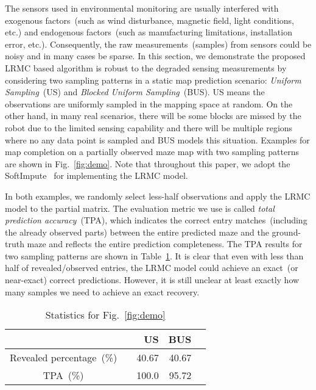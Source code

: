 The sensors used in environmental monitoring are usually interfered with exogenous factors~(such as wind disturbance, magnetic field, light conditions, etc.) and endogenous factors~(such as manufacturing limitations, installation error, etc.). Consequently, the raw measurements~(samples) from sensors could be noisy and in many cases be sparse. In this section, we demonstrate the proposed LRMC based algorithm is robust to the degraded sensing measurements by considering two sampling patterns in a static map prediction scenario: \textit{Uniform Sampling}~(US) and \textit{Blocked Uniform Sampling}~(BUS). US means the observations are uniformly sampled in the mapping space at random. On the other hand, in many real scenarios, there will be some blocks are missed by the robot due to the limited sensing capability and there will be multiple regions where no any data point is sampled and BUS models this situation. Examples for map completion on a partially observed maze map with two sampling patterns are shown in Fig.~\ref{fig:demo}. Note that throughout this paper, we adopt the  SoftImpute~\cite{mazumder2010spectral} for implementing the LRMC model.

In both examples, we randomly select less-half observations and apply the LRMC model to the partial matrix. The evaluation metric we use is called \textit{total prediction accuracy}~(TPA), which indicates the correct entry matches~(including the already observed parts) between the entire predicted maze and the ground-truth maze and reflects the entire prediction completeness. The TPA results for two sampling patterns are shown in Table~\ref{tb:exam_stat}. It is clear that even with less than half of revealed/observed entries, the LRMC model could achieve an exact~(or near-exact) correct predictions. However, it is still unclear at least exactly how many samples we need to achieve an exact recovery.

\begin{table}%
\caption{Statistics for Fig.~\ref{fig:demo}} %
\centering %
\begin{tabular}{c rrrr} %
\hline\hline %
  & \vline & US & BUS\\
\hline %
Revealed percentage~(\%) & \vline & 40.67 & 40.67\\ %
TPA~(\%) & \vline & 100.0 & 95.72\\
\hline %
\end{tabular}
\label{tb:exam_stat}
\end{table}

